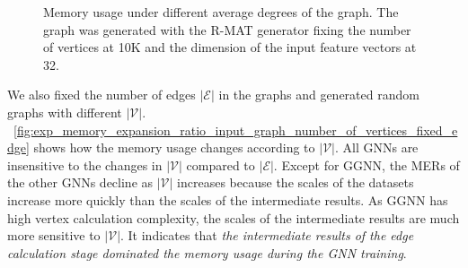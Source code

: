\begin{figure}[h]
    \centering
    \caption{Memory usage under different average degrees of the graph. The graph was generated with the R-MAT generator fixing the number of vertices at 10K and the dimension of the input feature vectors at 32.}
    \label{fig:exp_memory_expansion_ratio_input_graph_number_of_edges}
\end{figure}

We also fixed the number of edges $|\mathcal{E}|$ in the graphs and generated random graphs with different $|\mathcal{V}|$.
\figurename~\ref{fig:exp_memory_expansion_ratio_input_graph_number_of_vertices_fixed_edge} shows how the memory usage changes according to $|\mathcal{V}|$.
All GNNs are insensitive to the changes in $|\mathcal{V}|$ compared to $|\mathcal{E}|$.
Except for GGNN, the MERs of the other GNNs decline as $|\mathcal{V}|$ increases because the scales of the datasets increase more quickly than the scales of the intermediate results.
As GGNN has high vertex calculation complexity, the scales of the intermediate results are much more sensitive to $|\mathcal{V}|$.
It indicates that \emph{the intermediate results of the edge calculation stage dominated the memory usage during the GNN training}.

